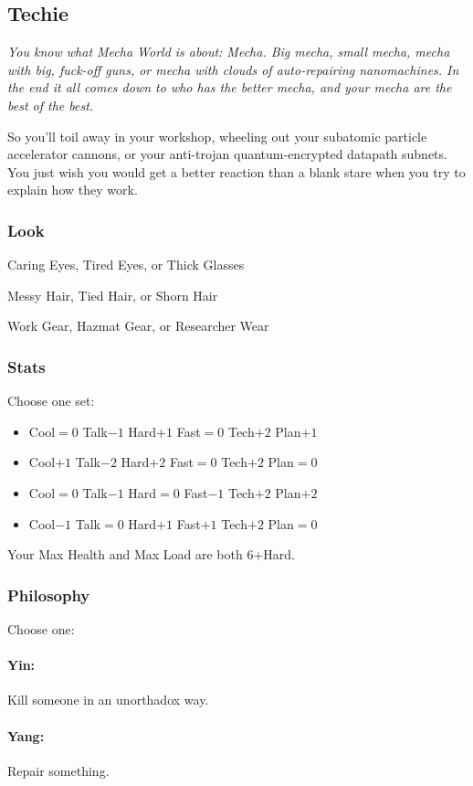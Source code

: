 \subsection{Techie}
{\itshape You know what Mecha World is about: Mecha. Big mecha, small
  mecha, mecha with big, fuck-off guns, or mecha with clouds of
  auto-repairing nanomachines. In the end it all comes down to who has
  the better mecha, and your mecha are the best of the best.

So you'll toil away in your workshop, wheeling out your subatomic
particle accelerator cannons, or your anti-trojan quantum-encrypted
datapath subnets. You just wish you would get a better reaction than a
blank stare when you try to explain how they work.}

\subsubsection{Look}

Caring Eyes, Tired Eyes, or Thick Glasses

Messy Hair, Tied Hair, or Shorn Hair

Work Gear, Hazmat Gear, or Researcher Wear

\subsubsection{Stats}
Choose one set:
\begin{itemize}
\setlength\itemsep{0em}
\item Cool${=}0$ Talk$-1$ Hard$+1$ Fast${=}0$ Tech$+2$ Plan$+1$
\item Cool$+1$ Talk$-2$ Hard$+2$ Fast${=}0$ Tech$+2$ Plan${=}0$
\item Cool${=}0$ Talk$-1$ Hard${=}0$ Fast$-1$ Tech$+2$ Plan$+2$
\item Cool$-1$ Talk${=}0$ Hard$+1$ Fast$+1$ Tech$+2$ Plan${=}0$
\end{itemize}

Your Max Health and Max Load are both 6+Hard.

\subsubsection{Philosophy}
Choose one:
\paragraph{Yin:} Kill someone in an unorthadox way.
\paragraph{Yang:} Repair something.

